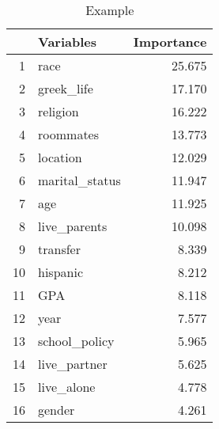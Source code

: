 \begin{table}[ht]
\centering
\begin{tabular}{rlr}
  \toprule
 & Variables & Importance \\ 
  \midrule
1 & race & 25.675 \\ 
  2 & greek\_life & 17.170 \\ 
  3 & religion & 16.222 \\ 
  4 & roommates & 13.773 \\ 
  5 & location & 12.029 \\ 
  6 & marital\_status & 11.947 \\ 
  7 & age & 11.925 \\ 
  8 & live\_parents & 10.098 \\ 
  9 & transfer & 8.339 \\ 
  10 & hispanic & 8.212 \\ 
  11 & GPA & 8.118 \\ 
  12 & year & 7.577 \\ 
  13 & school\_policy & 5.965 \\ 
  14 & live\_partner & 5.625 \\ 
  15 & live\_alone & 4.778 \\ 
  16 & gender & 4.261 \\ 
   \bottomrule
\end{tabular}
\caption{Example} 
\end{table}
